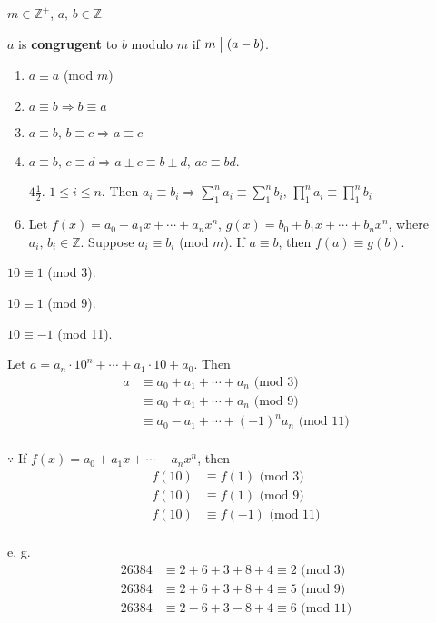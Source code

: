 
\begin{definition}
    $m \in \mathbb{Z}^+$, $a,\,b \in \mathbb{Z}$

    $a$ is \textbf{congrugent} to $b$ modulo $m$ if $m \bigm| \left(a-b\right)$.
\end{definition}

\begin{theorem}
    \begin{enumerate}
        \item $a \equiv a$ (mod $m$)
        \item $a \equiv b \Rightarrow b \equiv a$
        \item $a \equiv b,\, b \equiv c \Rightarrow a \equiv c$
        \item $a \equiv b,\, c \equiv d \Rightarrow a \pm c \equiv b \pm d,\, ac \equiv bd$.
        \item[$\mathit{4\frac{1}{2}}$.] $1 \leq i \leq n$. Then
        $a_i \equiv b_i \Rightarrow \sum_1^n a_i \equiv \sum_1^n b_i,\, \prod_1^n a_i \equiv \prod_1^n b_i$ 
        \item Let $f\left(x\right) = a_0 + a_1x + \cdots + a_nx^n$, $g\left(x\right) = b_0 + b_1x + \cdots + b_nx^n$,
        where $a_i,\,b_i \in \mathbb{Z}$. Suppose $a_i \equiv b_i$ (mod $m$). If $a \equiv b$, then $f\left(a\right) \equiv g\left(b\right)$.
    \end{enumerate}
\end{theorem}

\begin{example}
    $10 \equiv 1$ (mod 3).

    $10 \equiv 1$ (mod 9).
    
    $10 \equiv -1$ (mod 11).

    Let $a=a_n \cdot 10^n+\cdots+a_1 \cdot 10+a_0$. Then
    \begin{align*}
        a &\equiv a_0 + a_1 + \cdots + a_n \mbox{ (mod 3)} \\
        &\equiv a_0 + a_1 + \cdots + a_n \mbox{ (mod 9)} \\
        &\equiv a_0 - a_1 + \cdots + \left(-1\right)^n a_n \mbox{ (mod 11)} \\
    \end{align*}

    $\because$ If $f\left(x\right)=a_0+a_1x+\cdots+a_nx^n$, then
    \begin{align*}
        f\left(10\right) &\equiv f\left(1\right) \mbox{ (mod 3)} \\
        f\left(10\right) &\equiv f\left(1\right) \mbox{ (mod 9)} \\
        f\left(10\right) &\equiv f\left(-1\right) \mbox{ (mod 11)} \\
    \end{align*}

    e. g. 
    \begin{align*}
        26384 &\equiv 2+6+3+8+4 \equiv 2 \mbox{ (mod 3)} \\
        26384 &\equiv 2+6+3+8+4 \equiv 5 \mbox{ (mod 9)} \\
        26384 &\equiv 2-6+3-8+4 \equiv 6 \mbox{ (mod 11)} \\
    \end{align*}
\end{example}

